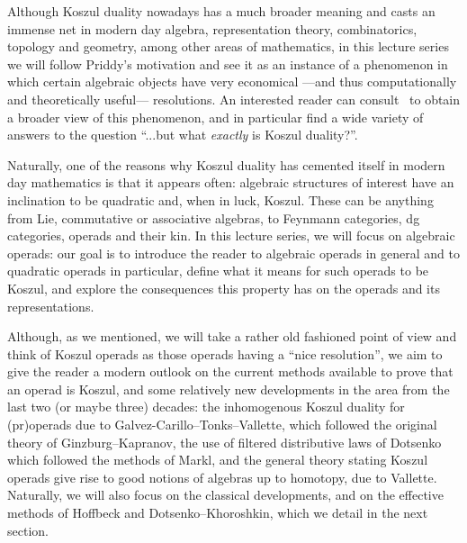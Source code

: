 \documentclass[fleqn, a4paper, twoside]{article}
\newcommand{\0}{\langle 0\rangle}
\DeclareRobustCommand{\[}{\begin{equation}}%
\DeclareRobustCommand{\]}{\end{equation}}%
\theoremstyle{mytheorem}
\theoremstyle{introthm}
\theoremstyle{mydefinition}
\theoremstyle{mydefinition2}
\theoremstyle{plain} %
\newcommand{\?}{\,?\,}
\theoremstyle{mytheorem}
\theoremstyle{plain} %
\begin{document}
Although Koszul duality nowadays has a much broader meaning
and casts an immense net in modern day algebra, representation
theory, combinatorics, topology and geometry, 
among other areas of mathematics, in this lecture
series we will follow Priddy's motivation and see it as an
instance of a phenomenon in which certain algebraic objects
have very economical ---and thus computationally and theoretically
useful--- resolutions. An interested reader can 
consult~\cite{KellerKoszul2003,Positselski2011,
Sinha2010,MO329,holstein2021categorical} to obtain a broader
view of this phenomenon, and in particular find a wide
variety of answers to the question ``...but what \emph{exactly}
is Koszul duality?''.  
%

Naturally, one of the reasons why Koszul duality has cemented
itself in modern day mathematics is that it appears often:
algebraic structures of interest have an inclination to be
quadratic and, when in luck, Koszul. These can be anything
from Lie, commutative or associative algebras, to Feynmann
categories, dg categories, operads and their kin. In this
lecture series, we will focus on algebraic operads: our goal
is to introduce the reader to algebraic operads in general
and to quadratic operads in particular, define what
it means for such operads to be Koszul, and explore
the consequences this property has on the operads
and its representations.

Although, as we
mentioned, we will take a rather old fashioned point of 
view and think of Koszul operads as those operads 
having a ``nice resolution'', we aim to give the reader
a modern outlook on the current methods available to
prove that an operad is Koszul, and some relatively 
new developments in the area from the last two (or
maybe three) decades:
the inhomogenous Koszul duality for (pr)operads due
to Galvez-Carillo--Tonks--Vallette, which
followed the original theory of Ginzburg--Kapranov,
the use of filtered distributive laws of Dotsenko
which followed the methods of Markl, and the general
theory stating Koszul operads give rise to good
notions of algebras up to homotopy, due to Vallette.
Naturally, we will also focus on the classical developments,
and on the effective methods of Hoffbeck and 
Dotsenko--Khoroshkin, which we detail in the next
section.
\end{document}

